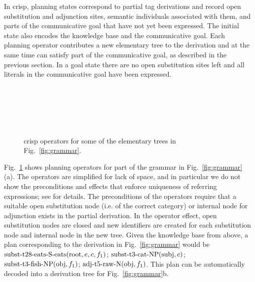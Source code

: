 In {\sc crisp}, planning states correspond to partial {\sc tag} derivations and record open substitution and adjunction sites, semantic individuals associated with them, and parts of the communicative goal that have not yet been expressed.  The initial state also encodes the knowledge base and the communicative goal. Each planning operator contributes a new elementary tree to the derivation and at the same time can satisfy part of the communicative goal, as described in the previous section. In a goal state there are no open substitution sites left and all literals in the communicative goal have been expressed. 
\begin{figure}[t]
\begin{center}
\\\smallskip

\\ \smallskip


\\\smallskip
\end{center}
\caption{\label{fig:crisp-operators} {\sc crisp} operators for some of the elementary trees in Fig.~\ref{fig:grammar}.}
\end{figure}


Fig.~\ref{fig:crisp-operators} shows planning operators for part of the grammar in Fig.~\ref{fig:grammar}(a). The operators are simplified for lack of space, and in particular we do not show the preconditions and effects that enforce uniqueness of referring expressions; see  for details.  The preconditions of the operators require that a suitable open substitution node (i.e. of the correct category) or internal node for adjunction exists in the partial derivation. In the operator effect, open substitution nodes are closed and new identifiers are created for each substitution node and internal node in the new tree. Given the knowledge base from above, a plan corresponding to the derivation in Fig.~\ref{fig:grammar} would be $\mbox{subst-t28-eats-S-eats}(\mbox{root}, e, c, f_1)$; $\mbox{subst-t3-cat-NP}(\mbox{subj},c)$; $\mbox{subst-t3-fish-NP}(\mbox{obj},f_1)$; $\mbox{adj-t5-raw-N}(\mbox{obj}, f_1)$. This plan can be automatically decoded into a derivation tree for Fig.~\ref{fig:grammar}b.

